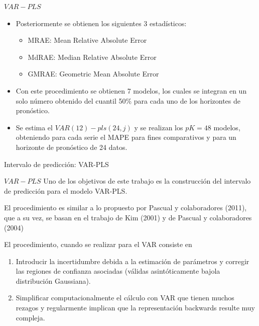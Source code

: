 \documentclass{beamer}
\newcommand{\?}{?`}
\begin{document}
\begin{frame}{$VAR-PLS$}
  \begin{itemize}
  \item Posteriormente se obtienen los siguientes 3 estad\'isticos:
    \begin{itemize}
    \item MRAE: Mean Relative Absolute Error
    \item MdRAE: Median Relative Absolute Error
    \item GMRAE: Geometric Mean Absolute Error
    \end{itemize}
  \item Con este procedimiento se obtienen 7 modelos, los cuales se
    integran en un solo n\'umero obtenido del cuantil 50\% para cada
    uno de los horizontes de pron\'ostico.
  \item Se estima el $VAR(12)-pls(24,j)$ y se realizan los $pK=48$
    modelos, obteniendo para cada serie el MAPE para fines
    comparativos y para un horizonte de pron\'ostico de 24 datos.
  \end{itemize}
\end{frame}

\begin{frame}{}
  \begin{block}{}
    \begin{center}
      \vspace{3mm}
      {\Large Intervalo de predicci\'on: VAR-PLS}
      \vspace{3mm}
    \end{center}
  \end{block}
\end{frame}

\begin{frame}{$VAR-PLS$}
  Uno de los objetivos de este trabajo es la construcci\'on del
  intervalo de predicci\'on para el modelo VAR-PLS.
  \medskip

  El procedimiento es similar a lo propuesto por Pascual y
  colaboradores (2011), que a su vez, se basan en el
  trabajo de Kim (2001) y de Pascual y colaboradores (2004)
  \medskip

  El procedimiento, cuando se realizar para el VAR consiste en
  \begin{enumerate}
  \item Introducir la incertidumbre debida a la estimaci\'on de
    par\'ametros y corregir las regiones de confianza asociadas
    (v\'alidas asint\'oticamente bajola distribuci\'on Gaussiana).
  \item Simplificar computacionalmente el c\'alculo con VAR que tienen
    muchos rezagos y regularmente implican que la representaci\'on
    backwards resulte muy compleja.
  \end{enumerate}
\end{frame}
\end{document}

